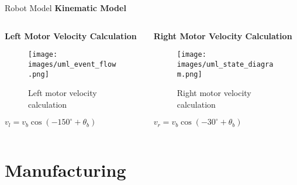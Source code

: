 \documentclass[aspectratio=169]{beamer}
\newcommand{\reducefontsize}{\fontsize{7}{9}\selectfont}
\begin{document}
\begin{frame}{Robot Model}
	\large{\textbf{Kinematic Model}}
	\vspace{0.3cm}

	\begin{columns}
		\begin{column}{0.5\textwidth}
      {\reducefontsize%
			\textbf{Left Motor Velocity Calculation}
			\begin{figure}
				\centering
				\texttt{[image: images/uml\_event\_flow.png]}
				\caption{Left motor velocity calculation}
			\end{figure}
			\begin{center}
				$v_l = v_b \cos(-150^{\circ} + \theta_b)$
			\end{center}
      }
		\end{column}
		\begin{column}{0.5\textwidth}
      {\reducefontsize%
			\textbf{Right Motor Velocity Calculation}
			\begin{figure}
				\centering
				\texttt{[image: images/uml\_state\_diagram.png]}
				\caption{Right motor velocity calculation}
			\end{figure}
			\begin{center}
				$v_r = v_b \cos(-30^{\circ} + \theta_b)$
			\end{center}
      }
		\end{column}
	\end{columns}

	\vspace{0.5cm}
	\begin{center}
	\end{center}

\end{frame}


\section{Manufacturing}
\end{document}
